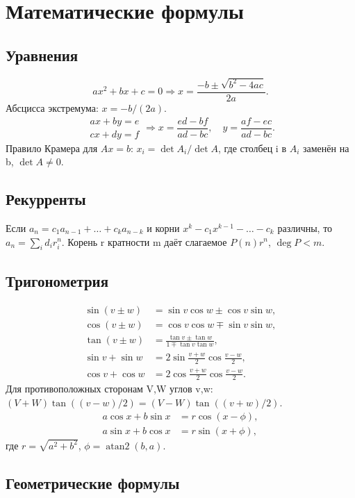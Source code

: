 \chapter{Математические формулы}
\section{Уравнения}
\[ ax^2+bx+c=0\Rightarrow x=\frac{-b\pm\sqrt{b^2-4ac}}{2a}. \]
Абсцисса экстремума: $x=-b/(2a)$.
\[\begin{aligned}ax+by=e\\cx+dy=f\end{aligned}
\Rightarrow x=\frac{ed-bf}{ad-bc},\quad y=\frac{af-ec}{ad-bc}.\]
Правило Крамера для $Ax=b$: $x_i=\det A_i/\det A$,
где столбец i в $A_i$ заменён на b, $\det A\ne0$.
\section{Рекурренты}
Если $a_n=c_1a_{n-1}+\dots+c_ka_{n-k}$ и корни
$x^k-c_1x^{k-1}-\dots-c_k$ различны, то $a_n=\sum_i d_ir_i^n$.
Корень r кратности m даёт слагаемое $P(n)r^n$, $\deg P<m$.
\section{Тригонометрия}
\begin{align*}
\sin(v\pm w)&=\sin v\cos w\pm\cos v\sin w,\\
\cos(v\pm w)&=\cos v\cos w\mp\sin v\sin w,\\
\tan(v\pm w)&=\frac{\tan v\pm\tan w}{1\mp\tan v\tan w},\\
\sin v+\sin w&=2\sin\frac{v+w}{2}\cos\frac{v-w}{2},\\
\cos v+\cos w&=2\cos\frac{v+w}{2}\cos\frac{v-w}{2}.
\end{align*}
Для противоположных сторонам V,W углов v,w:
$(V+W)\tan((v-w)/2)=(V-W)\tan((v+w)/2)$.
\begin{align*}
a\cos x+b\sin x&=r\cos(x-\phi),\\
a\sin x+b\cos x&=r\sin(x+\phi),
\end{align*}
где $r=\sqrt{a^2+b^2}$, $\phi=\operatorname{atan2}(b,a)$.
\section{Геометрические формулы}

